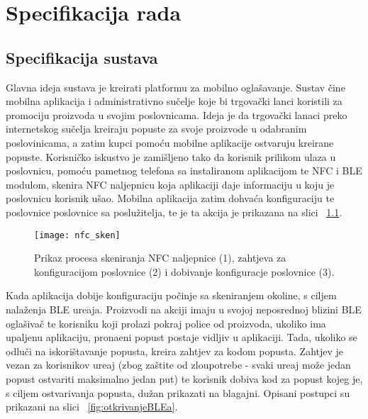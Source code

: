 \chapter{Specifikacija rada}


\section{Specifikacija sustava}

Glavna ideja sustava je kreirati platformu za mobilno ogla\v{s}avanje. Sustav \v{c}ine mobilna aplikacija i administrativno su\v{c}elje koje bi trgova\v{c}ki lanci koristili za promociju proizvoda u svojim poslovnicama. Ideja je da trgova\v{c}ki lanaci preko internetskog su\v{c}elja kreiraju popuste za svoje proizvode u odabranim poslovinicama, a zatim kupci pomo\'{c}u mobilne aplikacije ostvaruju kreirane popuste. Korisni\v{c}ko iskustvo je zami\v{s}ljeno tako da korisnik prilikom ulaza u poslovnicu, pomo\'{c}u pametnog telefona sa instaliranom aplikacijom te NFC i BLE modulom, skenira NFC naljepnicu koja aplikaciji daje informaciju u koju je poslovnicu korisnik u\v{s}ao. Mobilna aplikacija zatim dohva\'{c}a konfiguraciju te poslovnice poslovnice sa poslu\v{z}itelja, te je ta akcija je prikazana na slici ~\ref{fig:skeniranjeNaljepnice}.

\begin{figure}[!htbp]
	\begin{center}
 \texttt{[image: nfc\_sken]}
 \caption{Prikaz procesa skeniranja NFC naljepnice (1), zahtjeva za konfiguracijom poslovnice (2) i dobivanje konfiguracje poslovnice (3).}
 \label{fig:skeniranjeNaljepnice}
	\end{center}
\end{figure}

Kada aplikacija dobije konfiguraciju po\v{c}inje sa skeniranjem okoline, s ciljem nala\v{z}enja BLE ure\dj aja. Proizvodi na akciji imaju u svojoj neposrednoj blizini BLE ogla\v{s}iva\v{c} te korisniku koji prolazi pokraj police od proizvoda, ukoliko ima upaljenu aplikaciju, prona\dj eni popust postaje vidljiv u aplikaciji. Tada, ukoliko se odlu\v{c}i na iskori\v{s}tavanje popusta, kreira zahtjev za kodom popusta. Zahtjev je vezan za korisnikov ure\dj aj (zbog za\v{s}tite od zloupotrebe - svaki ure\dj aj mo\v{z}e jedan popust ostvariti maksimalno jedan put) te korisnik dobiva kod za popust kojeg je, s ciljem ostvarivanja popusta, du\v{z}an prikazati na blagajni. Opisani postupci su prikazani na slici  ~\ref{fig:otkrivanjeBLEa}.

